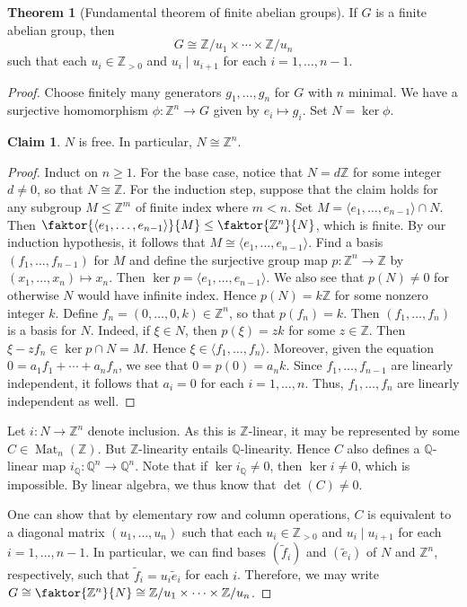 \documentclass[10pt,letterpaper,cm]{nupset}
\theoremstyle{definition}
\theoremstyle{theorem}
\newtheorem{theorem}[definition]{Theorem}
\newtheorem*{claim}{Claim}
\theoremstyle{remark}
\newcommand{\Q}{\mathbb Q}
\newcommand{\Z}{\mathbb Z}
\newcommand{\1}{\mathbf{1}}
\newcommand{\0}{\vec 0}
\DeclareMathOperator{\Mat}{Mat}
\begin{document}
\begin{theorem}[Fundamental theorem of finite abelian groups]
If $G$ is a finite abelian group, then $$ G \cong \Z/u_1 \times \cdots \times \Z/u_n$$ such that each $u_i \in \Z_{>0}$ and $u_i \mid u_{i+1}$ for each $i=1, \ldots, n-1$.
\end{theorem}
\begin{proof}
Choose finitely many generators $g_1, \ldots, g_n$ for $G$ with $n$ minimal. We have a surjective homomorphism $\phi : \Z^n \to G$ given by $e_i \mapsto g_i$. Set $ N = \ker \phi$.
\begin{claim}
$N$ is free. In particular, $N \cong \Z^n$.
\end{claim}
\begin{proof}
Induct on $n\geq 1$. For the base case, notice that  $N = d\Z$ for some integer $d\ne 0$, so that $N \cong \Z$. For the induction step, suppose that the claim holds for any subgroup $M\leq \Z^m$ of finite index where $m<n$. Set $M = \langle e_1, \ldots, e_{n-1}\rangle\cap N$. Then $\faktor{\langle e_1, \ldots, e_{n-1}\rangle}{M}\leq \faktor{\Z^n}{N}$, which is finite. By our induction hypothesis, it follows that $M \cong \langle e_1, \ldots, e_{n-1}\rangle$. Find a basis $(f_1, \ldots, f_{n-1})$ for $M$ and define the surjective group map $p : \Z^n \to \Z$ by $(x_1, \ldots, x_n) \mapsto x_n.$ Then $\ker p = \langle e_1, \ldots, e_{n-1}\rangle$. We also see that $p(N) \ne 0$ for otherwise $N$ would have infinite index. Hence $p(N) = k\Z$ for some nonzero integer $k$. Define $f_n = (0, \ldots, 0, k)\in \Z^n$, so that $p(f_n) =k$. Then $(f_1, \ldots, f_n)$ is a basis for $N$. Indeed, if $\xi \in N$, then $p(\xi) = zk$ for some $z\in \Z$. Then $\xi - zf_n \in \ker p \cap N = M$. Hence $\xi \in \langle f_1, \ldots, f_n\rangle$. Moreover, given the equation $0 = a_1f_1 + \cdots + a_nf_n$, we see that $0= p(0) = a_nk$. Since $f_1, \ldots, f_{n-1}$ are linearly independent, it follows that $a_i= 0$ for each $i=1, \ldots, n$. Thus, $f_1, \ldots, f_n$ are linearly independent as well.
\end{proof}
Let $i : N \to \Z^n$ denote inclusion. As this is $\Z$-linear, it may be represented by some $C\in \Mat_n(\Z)$. But $\Z$-linearity entails $\Q$-linearity. Hence $C$ also defines a $\Q$-linear map $i_{\Q} : \Q^n \to \Q^n$. Note that if $\ker i_{\Q} \ne 0$, then $\ker i \ne 0$, which is impossible. By linear algebra, we thus know that $\det(C) \ne 0$.

One can show that by elementary row and column operations, $C$ is equivalent to a diagonal matrix $(u_1, \ldots, u_n)$ such that each $u_i \in \Z_{>0}$ and $u_i \mid u_{i+1}$ for each $i=1, \ldots, n-1$. In particular, we can find bases $(\tilde{f}_i)$ and $(\tilde{e}_i)$ of $N$ and $\Z^n$, respectively, such that $ \tilde{f}_i = u_i \tilde{e}_i$ for each $i$. Therefore, we may write $G\cong \faktor{\Z^n}{N} \cong \Z/u_1 \times \cdots \times \Z/u_n$.
\end{proof}
\end{document}
